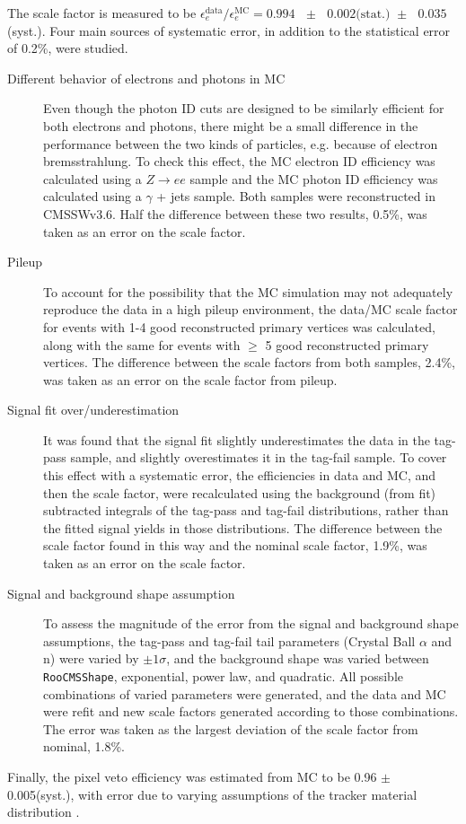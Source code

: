\documentclass[dissertation.tex]{subfiles}
\begin{document}
\marginpar{\textcolor{blue}{Official result uses this syst. error, so I am not rechecking it}}The scale factor is measured to be $\epsilon_{e}^{\mathrm{data}}/\epsilon_{e}^{\mathrm{MC}} = 0.994\mbox{ }\pm\mbox{ }0.002\mbox{(stat.) }\pm\mbox{ }0.035$(syst.).  Four main sources of systematic error, in addition to the statistical error of 0.2\%, were studied.

\begin{description}
  \item[Different behavior of electrons and photons in MC] Even though the photon ID cuts are designed to be similarly efficient for both electrons and photons, there might be a small difference in the performance between the two kinds of particles, e.g. because of electron bremsstrahlung.  To check this effect, the MC electron ID efficiency was calculated using a $Z\rightarrow ee$ sample and the MC photon ID efficiency was calculated using a $\gamma$ + jets sample.  Both samples were reconstructed in CMSSWv3.6.  Half the difference between these two results, 0.5\%, was taken as an error on the scale factor.
  \item[Pileup] \marginpar{\textcolor{blue}{Corrected some of these bullets}}To account for the possibility that the MC simulation may not adequately reproduce the data in a high pileup environment, the data/MC scale factor for events with 1-4 good reconstructed primary vertices was calculated, along with the same for events with $\geq$ 5 good reconstructed primary vertices.  The difference between the scale factors from both samples, 2.4\%, was taken as an error on the scale factor from pileup.
  \item[Signal fit over/underestimation] It was found that the signal fit slightly underestimates the data in the tag-pass sample, and slightly overestimates it in the tag-fail sample.  To cover this effect with a systematic error, the efficiencies in data and MC, and then the scale factor, were recalculated using the background (from fit) subtracted integrals of the tag-pass and tag-fail distributions, rather than the fitted signal yields in those distributions.  The difference between the scale factor found in this way and the nominal scale factor, 1.9\%, was taken as an error on the scale factor.
  \item[Signal and background shape assumption] To assess the magnitude of the error from the signal and background shape assumptions, the tag-pass and tag-fail tail parameters (Crystal Ball $\alpha$ and n) were varied by $\pm1\sigma$, and the background shape was varied between \verb+RooCMSShape+, exponential, power law, and quadratic.  All possible combinations of varied parameters were generated, and the data and MC were refit and new scale factors generated according to those combinations.  The error was taken as the largest deviation of the scale factor from nominal, 1.8\%.
\end{description}

Finally, the pixel veto efficiency was estimated from MC to be 0.96 $\pm$ 0.005(syst.), with error due to varying assumptions of the tracker material distribution \cite{CMS_AN-2010/271}.
\end{document}
